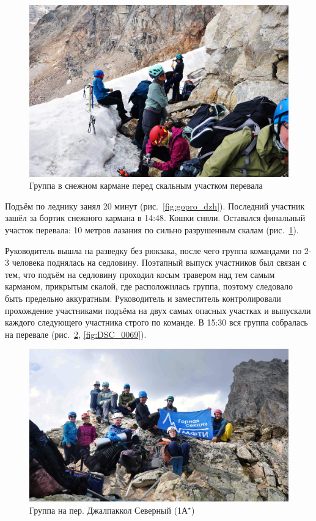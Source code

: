 \begin{figure}[h!]	
	\centering
	\includegraphics[angle=0, width=0.7\linewidth]{../pics/DSC_0021}
	\caption{Группа в снежном кармане перед скальным участком перевала}
	\label{fig:DSC_0021}
\end{figure}

Подъём по леднику занял 20 минут (рис.~\ref{fig:gopro_dzh}). Последний участник зашёл за бортик снежного кармана в 14:48. Кошки сняли. Оставался финальный участок перевала: 10 метров лазания по сильно разрушенным скалам (рис.~\ref{fig:DSC_0021}).

Руководитель вышла на разведку без рюкзака, после чего группа командами по 2-3 человека поднялась на седловину. Поэтапный выпуск участников был связан с тем, что подъём на седловину проходил косым травером над тем самым карманом, прикрытым скалой, где расположилась группа, поэтому следовало быть предельно аккуратным. Руководитель и заместитель контролировали прохождение участниками подъёма на двух самых опасных участках и выпускали каждого следующего участника строго по команде. В 15:30 вся группа собралась на перевале (рис.~\ref{fig:DSC_0063}, \ref{fig:DSC_0069}).

\begin{figure}[h!]	
	\centering
	\includegraphics[angle=0, width=0.7\linewidth]{../pics/DSC_0063}
	\caption{Группа на пер. Джалпаккол Северный (1А$^\star$)}
	\label{fig:DSC_0063}
\end{figure}

